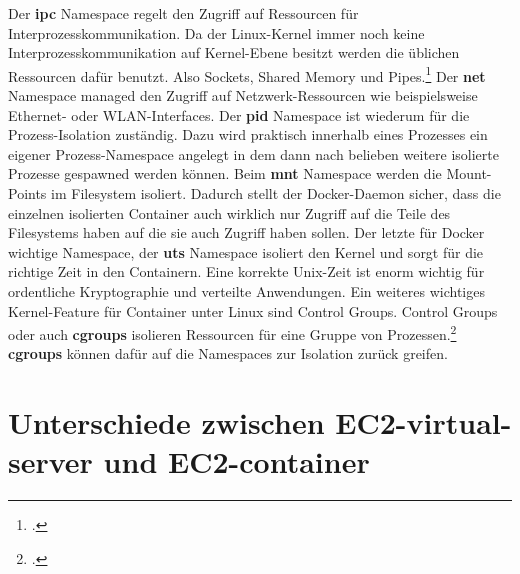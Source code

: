 \documentclass[titlepage]{report}
\begin{document}
Der \textbf{ipc} Namespace regelt den Zugriff auf Ressourcen für
Interprozesskommunikation. Da der Linux\hyp{}Kernel immer noch keine
Interprozesskommunikation auf Kernel\hyp{}Ebene besitzt werden die
üblichen Ressourcen dafür benutzt. Also Sockets, Shared Memory und
Pipes.\footcite{ipc} Der \textbf{net} Namespace managed den Zugriff auf
Netzwerk\hyp{}Ressourcen wie beispielsweise Ethernet\hyp{} oder
WLAN\hyp{}Interfaces. Der \textbf{pid} Namespace ist wiederum für die
Prozess\hyp{}Isolation zuständig. Dazu wird praktisch innerhalb eines
Prozesses ein eigener Prozess\hyp{}Namespace angelegt in dem dann nach
belieben weitere isolierte Prozesse gespawned werden können. Beim
\textbf{mnt} Namespace werden die Mount\hyp{}Points im Filesystem
isoliert. Dadurch stellt der Docker\hyp{}Daemon sicher, dass die
einzelnen isolierten Container auch wirklich nur Zugriff auf die Teile
des Filesystems haben auf die sie auch Zugriff haben sollen. Der letzte
für Docker wichtige Namespace, der \textbf{uts} Namespace isoliert den
Kernel und sorgt für die richtige Zeit in den Containern. Eine korrekte
Unix\hyp{}Zeit ist enorm wichtig für ordentliche Kryptographie und
verteilte Anwendungen. Ein weiteres wichtiges Kernel\hyp{}Feature für
Container unter Linux sind Control Groups. Control Groups oder auch
\textbf{cgroups} isolieren Ressourcen für eine Gruppe von
Prozessen.\footcite{cgroups}
\textbf{cgroups} können dafür auf die Namespaces zur Isolation zurück
greifen.
\section{Unterschiede zwischen EC2\hyp{}virtual\hyp{}server und EC2\hyp{}container}
\nocite{*}
\printbibliography
\listoffigures
\end{document}
